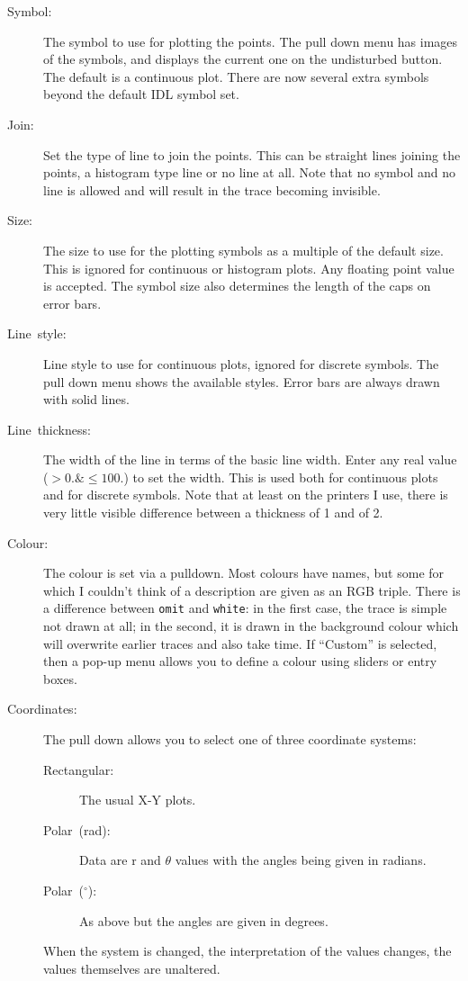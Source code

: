 \documentclass[11pt,twoside,english]{article}
\begin{document}
\begin{description}
\item [Symbol:]The symbol to use for plotting the points. The pull down
  menu has images of the symbols, and displays the current one on the
  undisturbed button. The default is a continuous plot. There are now
  several extra symbols beyond the default IDL symbol set.
\item [Join:]Set the type of line to join the points. This can be
  straight lines joining the points, a histogram type line or no line
  at all.  Note that no symbol and no line is allowed and will result
  in the trace becoming invisible.
\item [Size:]The size to use for the plotting symbols as a multiple of
  the default size. This is ignored for continuous or histogram plots.
  Any floating point value is accepted. The symbol size also determines
  the length of the caps on error bars.
\item [Line~style:]Line style to use for continuous plots, ignored for
  discrete symbols. The pull down menu shows the available
  styles. Error bars are always drawn with solid lines.
\item [Line~thickness:]The width of the line in terms of the basic line
  width. Enter any real value ($>0. \& \leq100.$) to set the width. This is used
  both for continuous plots and for discrete symbols. Note that at
  least on the printers I use, there is very little visible difference
  between a thickness of 1 and of 2.
\item [Colour:]The colour is set via a pulldown. Most colours have
  names, but some for which I couldn't think of a description are given
  as an RGB triple. There is a difference between \texttt{omit} and
  \texttt{white}: in the first case, the trace is simple not drawn at
  all; in the second, it is drawn in the background colour which will
  overwrite earlier traces and also take time. If ``Custom'' is
  selected, then a pop-up menu allows you to define a colour using
  sliders or entry boxes.
\item [Coordinates:]The pull down allows you to select one of three
  coordinate systems:

  \begin{description}
  \item [Rectangular:]The usual X-Y plots.
  \item [Polar~(rad):]Data are $\mathrm{r}$ and $\theta$ values with
    the angles being given in radians.
  \item [Polar~($^{\circ}$):]As above but the angles are given in
    degrees.
  \end{description}
  When the system is changed, the interpretation of the values changes,
  the values themselves are unaltered.


\end{description}
\end{document}
